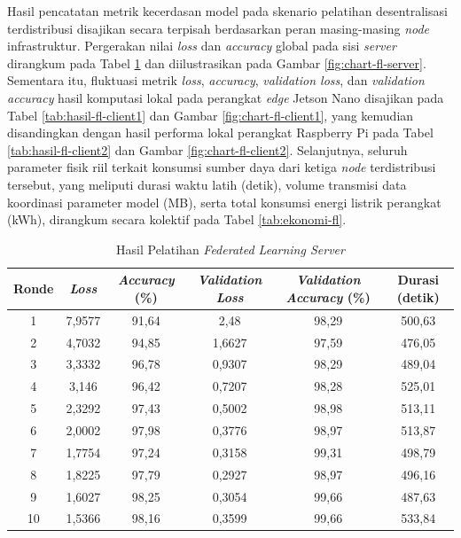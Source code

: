 Hasil pencatatan metrik kecerdasan model pada skenario pelatihan desentralisasi terdistribusi disajikan secara terpisah berdasarkan peran masing-masing \textit{node} infrastruktur. Pergerakan nilai \textit{loss} dan \textit{accuracy} global pada sisi \textit{server} dirangkum pada Tabel \ref{tab:hasil-fl-server} dan diilustrasikan pada Gambar \ref{fig:chart-fl-server}. Sementara itu, fluktuasi metrik \textit{loss}, \textit{accuracy}, \textit{validation loss}, dan \textit{validation accuracy} hasil komputasi lokal pada perangkat \textit{edge} Jetson Nano disajikan pada Tabel \ref{tab:hasil-fl-client1} dan Gambar \ref{fig:chart-fl-client1}, yang kemudian disandingkan dengan hasil performa lokal perangkat Raspberry Pi pada Tabel \ref{tab:hasil-fl-client2} dan Gambar \ref{fig:chart-fl-client2}. Selanjutnya, seluruh parameter fisik riil terkait konsumsi sumber daya dari ketiga \textit{node} terdistribusi tersebut, yang meliputi durasi waktu latih (detik), volume transmisi data koordinasi parameter model (MB), serta total konsumsi energi listrik perangkat (kWh), dirangkum secara kolektif pada Tabel \ref{tab:ekonomi-fl}.

\begin{table}[H]
  \centering
  \caption{Hasil Pelatihan \textit{Federated Learning Server}}
  \label{tab:hasil-fl-server}
  \begin{tabular}{|c|c|c|c|c|c|}
    \hline
    Ronde & \textit{Loss} & \textit{Accuracy} (\%) & \textit{Validation Loss} & \textit{Validation Accuracy} (\%) & Durasi (detik) \\
    \hline
    1 & 7,9577 & 91,64 & 2,48 & 98,29 & 500,63 \\
    2 & 4,7032 & 94,85 & 1,6627 & 97,59 & 476,05 \\
    3 & 3,3332 & 96,78 & 0,9307 & 98,29 & 489,04 \\
    4 & 3,146 & 96,42 & 0,7207 & 98,28 & 525,01 \\
    5 & 2,3292 & 97,43 & 0,5002 & 98,98 & 513,11 \\
    6 & 2,0002 & 97,98 & 0,3776 & 98,97 & 513,87 \\
    7 & 1,7754 & 97,24 & 0,3158 & 99,31 & 498,79 \\
    8 & 1,8225 & 97,79 & 0,2927 & 98,97 & 496,16 \\
    9 & 1,6027 & 98,25 & 0,3054 & 99,66 & 487,63 \\
    10 & 1,5366 & 98,16 & 0,3599 & 99,66 & 533,84 \\
    \hline
  \end{tabular}
\end{table}

